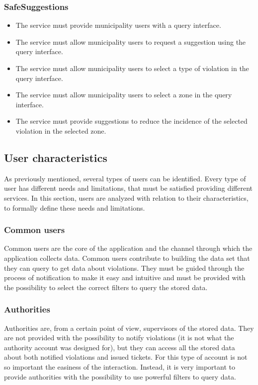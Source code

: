 \documentclass[a4paper]{article}
\begin{document}
\subsubsection{SafeSuggestions}

\begin{itemize}
\item
  The service must provide municipality users with a query interface.
\item
  The service must allow municipality users to request a suggestion
  using the query interface.
\item
  The service must allow municipality users to select a type of
  violation in the query interface.
\item
  The service must allow municipality users to select a zone in the
  query interface.
\item
  The service must provide suggestions to reduce the incidence of the
  selected violation in the selected zone.
\end{itemize}

\subsection{User characteristics}

As previously mentioned, several types of users can be identified. Every
type of user has different needs and limitations, that must be satisfied
providing different services. In this section, users are analyzed with
relation to their characteristics, to formally define these needs and
limitations.

\subsubsection{Common users}

Common users are the core of the application and the channel through
which the application collects data. Common users contribute to building
the data set that they can query to get data about violations. They must
be guided through the process of notification to make it easy and
intuitive and must be provided with the possibility to select the
correct filters to query the stored data.

\subsubsection{Authorities}

Authorities are, from a certain point of view, supervisors of the stored
data. They are not provided with the possibility to notify violations
(it is not what the authority account was designed for), but they can
access all the stored data about both notified violations and issued
tickets. For this type of account is not so important the easiness of
the interaction. Instead, it is very important to provide authorities
with the possibility to use powerful filters to query data.
\end{document}
